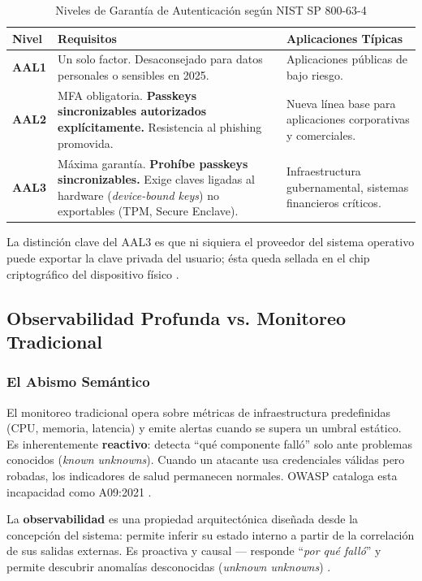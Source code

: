 \documentclass[12pt, a4paper]{article}
\begin{document}
\begin{table}[h!]
\centering
\caption{Niveles de Garantía de Autenticación según NIST SP 800-63-4}
\label{tab:aal}
\begin{tabularx}{\textwidth}{>{\bfseries}l X X}
\toprule
Nivel & Requisitos & Aplicaciones Típicas \\
\midrule
AAL1 & Un solo factor. Desaconsejado para datos personales o sensibles en 2025. &
      Aplicaciones públicas de bajo riesgo. \\[4pt]
AAL2 & MFA obligatoria. \textbf{Passkeys sincronizables autorizados
       explícitamente.} Resistencia al phishing promovida. &
      Nueva línea base para aplicaciones corporativas y comerciales. \\[4pt]
AAL3 & Máxima garantía. \textbf{Prohíbe passkeys sincronizables.} Exige claves
       ligadas al hardware (\textit{device-bound keys}) no exportables (TPM,
       Secure Enclave). &
      Infraestructura gubernamental, sistemas financieros críticos. \\
\bottomrule
\end{tabularx}
\end{table}

La distinción clave del AAL3 es que ni siquiera el proveedor del sistema operativo
puede exportar la clave privada del usuario; ésta queda sellada en el chip
criptográfico del dispositivo físico \cite{nist80063,hypr2025}.

\subsection{Observabilidad Profunda vs. Monitoreo Tradicional}
\label{sec:obs}

\subsubsection{El Abismo Semántico}

El monitoreo tradicional opera sobre métricas de infraestructura predefinidas
(CPU, memoria, latencia) y emite alertas cuando se supera un umbral estático.
Es inherentemente \textbf{reactivo}: detecta ``qué componente falló'' solo ante
problemas conocidos (\textit{known unknowns}). Cuando un atacante usa
credenciales válidas pero robadas, los indicadores de salud permanecen normales.
OWASP cataloga esta incapacidad como A09:2021 \cite{owasptop10}.

La \textbf{observabilidad} es una propiedad arquitectónica diseñada desde la
concepción del sistema: permite inferir su estado interno a partir de la
correlación de sus salidas externas. Es proactiva y causal --- responde
``\textit{por qué falló}'' y permite descubrir anomalías desconocidas
(\textit{unknown unknowns}) \cite{newrelic2025,crowdstrike2025,dynatrace2025}.
\end{document}
